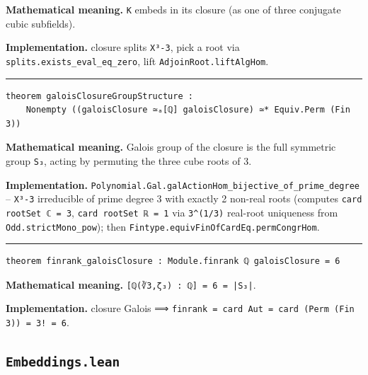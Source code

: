 \documentclass[UTF8,a4paper,11pt,fontset=fandol]{ctexart}
\theoremstyle{definition}
\newcommand{\statementsep}{\par\medskip\hrule\medskip}
\begin{document}
\noindent\textbf{Mathematical meaning.} \texttt{K} embeds in its closure (as one of three conjugate cubic subfields).\par
\noindent\textbf{Implementation.} closure splits \texttt{X³-3}, pick a root via \texttt{splits.\allowbreak{}exists\_\allowbreak{}eval\_\allowbreak{}eq\_\allowbreak{}zero}, lift \texttt{AdjoinRoot.\allowbreak{}liftAlgHom}.\par
\statementsep
\begin{verbatim}
theorem galoisClosureGroupStructure :
    Nonempty ((galoisClosure ≃ₐ[ℚ] galoisClosure) ≃* Equiv.Perm (Fin 3))
\end{verbatim}
\noindent\textbf{Mathematical meaning.} Galois group of the closure is the full symmetric group \texttt{S₃}, acting by permuting the three cube roots of 3.\par
\noindent\textbf{Implementation.} \texttt{Polynomial.\allowbreak{}Gal.\allowbreak{}galActionHom\_\allowbreak{}bijective\_\allowbreak{}of\_\allowbreak{}prime\_\allowbreak{}degree} -- \texttt{X³-3} irreducible of prime degree 3 with exactly 2 non-real roots (computes \texttt{card rootSet ℂ = 3}, \texttt{card rootSet ℝ = 1} via \texttt{3\textasciicircum{}(1/\allowbreak{}3)} real-root uniqueness from \texttt{Odd.\allowbreak{}strictMono\_\allowbreak{}pow}); then \texttt{Fintype.\allowbreak{}equivFinOfCardEq.\allowbreak{}permCongrHom}.\par
\statementsep
\begin{verbatim}
theorem finrank_galoisClosure : Module.finrank ℚ galoisClosure = 6
\end{verbatim}
\noindent\textbf{Mathematical meaning.} \texttt{[ℚ(∛3,ζ₃) : ℚ] = 6 = |S₃|}.\par
\noindent\textbf{Implementation.} closure Galois ⟹ \texttt{finrank = card Aut = card (Perm (Fin 3)) = 3! = 6}.\par

\subsection{\texttt{Embeddings.lean}}
\end{document}
